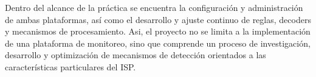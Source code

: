 Dentro del alcance de la práctica se encuentra la configuración y administración de ambas plataformas, así como el desarrollo y ajuste continuo de reglas, decoders y mecanismos de procesamiento. Asi, el proyecto no se limita a la implementación de una plataforma de monitoreo, sino que comprende un proceso de investigación, desarrollo y optimización de mecanismos de detección orientados a las características particulares del ISP.